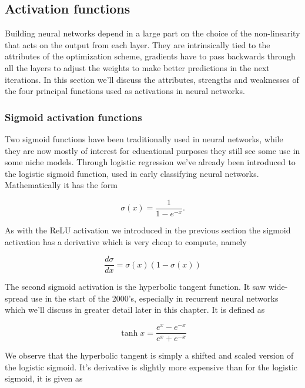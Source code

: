 \subsection{Activation functions}\label{sec:activation}

Building neural networks depend in a large part on the choice of the non-linearity that acts on the output from each layer. They are intrinsically tied to the attributes of the optimization scheme, gradients have to pass backwards through all the layers to adjust the weights to make better predictions in the next iterations. In this section we'll discuss the attributes, strengths and weaknesses of the four principal functions used as activations in neural networks. 

\subsubsection{Sigmoid activation functions}

Two sigmoid functions have been traditionally used in neural networks, while they are now mostly of interest for educational purposes they still see some use in some niche models. Through logistic regression we've already been introduced to the logistic sigmoid function, used in early classifying neural networks. Mathematically it has the form 

\begin{equation}
\sigma(x) = \frac{1}{1-e^{-x}}.
\end{equation}

\noindent As with the ReLU activation we introduced in the previous section the sigmoid activation has a derivative which is very cheap to compute, namely

\begin{equation}
\frac{d\sigma}{dx} = \sigma(x)(1 - \sigma(x))
\end{equation}

\noindent The second sigmoid activation is the hyperbolic tangent function. It saw wide-spread use in the start of the 2000's, especially in recurrent neural networks which we'll discuss in greater detail later in this chapter. It is defined as 

\begin{equation}
\tanh x = \frac{e^x - e^{-x}}{e^x + e^{-x}}
\end{equation}

\noindent We observe that the hyperbolic tangent is simply a shifted and scaled version of the logistic sigmoid. It's derivative is slightly more expensive than for the logistic sigmoid, it is given as 


